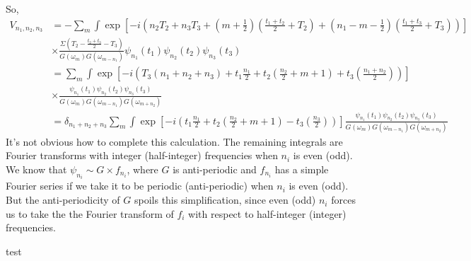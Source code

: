 \documentclass[aps,prx,preprint,onecolumn,citeautoscript,footinbib]{revtex4-1}
\begin{document}
So,
\begin{equation*}
    \begin{aligned}
        V_{n_1, n_2, n_3} &=-\sum_m  \int \exp\left[-i \left(n_2 T_2 + n_3 T_3 + \left(m + \frac{1}{2}\right)\left(\frac{t_1 + t_2}{2} + T_2\right) +  \left(n_1-m - \frac{1}{2}\right)\left(\frac{t_1 + t_3}{2} + T_3\right)\right)\right]
        \\
        &\times \frac{\Sigma\left(T_2 - \frac{t_2 + t_3}{2} - T_3\right)}{G(\omega_m) G(\omega_{m-n_1})}\psi_{n_1}(t_1)\psi_{n_2}(t_2)\psi_{n_3}(t_3)
        \\
        &= \sum_m \int %
        \exp\left[-i\left(T_3(n_1 + n_2 + n_3) + t_1 \frac{n_1}{2} + t_2 \left(\frac{n_2}{2}+m+1\right) + t_3\left(\frac{n_1 + n_2}{2}\right)\right)\right]
        \\
        &\times \frac{\psi_{n_1}(t_1) \psi_{n_2}(t_2) \psi_{n_3}(t_3)}{G(\omega_m) G(\omega_{m-{n_1}})G(\omega_{m + n_2})}
        \\
        &= \delta_{n_1 + n_2 + n_3} \sum_m\int  \exp\left[-i\left(t_1 \frac{n_1}{2} + t_2 \left(\frac{n_2}{2}+m+1\right) - t_3\left(\frac{n_3}{2}\right)\right)\right]\frac{\psi_{n_1}(t_1) \psi_{n_2}(t_2) \psi_{n_3}(t_3)}{G(\omega_m) G(\omega_{m-{n_1}})G(\omega_{m + n_2})}
    \end{aligned}
\end{equation*}
It's not obvious how to complete this calculation. The remaining integrals are Fourier transforms with integer (half-integer) frequencies when $n_i$ is even (odd). We know that $\psi_{n_i} \sim G \times f_{n_i}$, where $G$ is anti-periodic and $f_{n_i}$ has a simple Fourier series if we take it to be periodic (anti-periodic) when $n_i$ is even (odd). But the anti-periodicity of $G$ spoils this simplification, since even (odd) $n_i$ forces us to take the the Fourier transform of $f_i$ with respect to half-integer (integer) frequencies.

test
\end{document}

